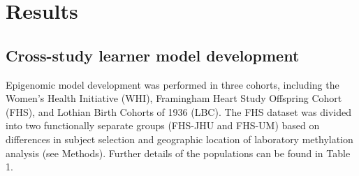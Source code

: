 \documentclass[]{article}
\begin{document}
\hypertarget{results}{%
\section{Results}\label{results}}

\hypertarget{cross-study-learner-model-development}{%
\subsection{Cross-study learner model
development}\label{cross-study-learner-model-development}}

Epigenomic model development was performed in three cohorts, including
the Women's Health Initiative (WHI), Framingham Heart Study Offspring
Cohort (FHS), and Lothian Birth Cohorts of 1936 (LBC). The FHS dataset
was divided into two functionally separate groups (FHS-JHU and FHS-UM)
based on differences in subject selection and geographic location of
laboratory methylation analysis (see Methods). Further details of the
populations can be found in Table 1.
\end{document}
